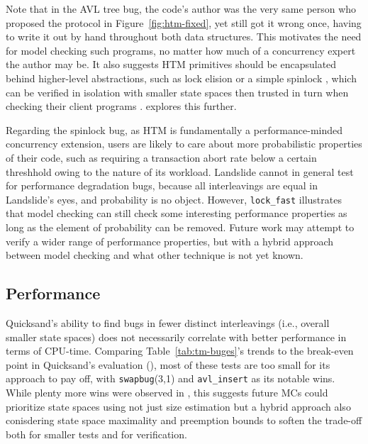 Note that in the AVL tree bug,
the code's author was the very same person who proposed the protocol in Figure~\ref{fig:htm-fixed},
yet still got it wrong once, having to write it out by hand throughout both data structures.
This motivates the need for model checking such programs,
no matter how much of a concurrency expert the author may be.
It also suggests HTM primitives should be encapsulated behind higher-level abstractions,
such as lock elision \cite{lock-elision}
or a simple spinlock \cite{spinlock-rtm-github},
which can be verified in isolation with smaller state spaces
then trusted in turn when checking their client programs \cite{dbug-phdthesis}.
\sect{\ref{sec:tm-verif}} explores this further.

Regarding the spinlock bug,
as HTM is fundamentally a performance-minded concurrency extension,
users are likely to care about more probabilistic properties of their code,
such as requiring a transaction abort rate below a certain threshhold
owing to the nature of its workload.
Landslide cannot in general test for performance degradation bugs,
because all interleavings are equal in Landslide's eyes, and probability is no object.
However, {\tt lock\_fast} illustrates that model checking can still check some interesting performance properties
as long as the element of probability can be removed.
Future work may attempt to verify a wider range of performance properties,
but with a hybrid approach between model checking and what other technique is not yet known.

\subsection{Performance}

Quicksand's ability to find bugs in fewer distinct interleavings (i.e., overall smaller state spaces)
does not necessarily correlate with better performance in terms of CPU-time.
Comparing Table~\ref{tab:tm-buges}'s trends
to the break-even point in Quicksand's evaluation (\sect{\ref{sec:quicksand-eval}}),
most of these tests are too small for its approach to pay off,
with {\tt swapbug}(3,1) and {\tt avl\_insert} as its notable wins.
While plenty more wins were observed in \sect{\ref{sec:quicksand-eval}},
this suggests
future MCs could prioritize state spaces using not just size estimation
but a hybrid approach also conisdering state space maximality and preemption bounds \cite{chess-icb}
to soften the trade-off
both for smaller tests and for verification.

